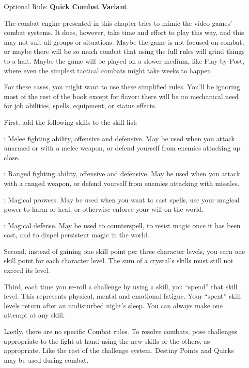 \begin{multiboco}
    Optional Rule: \textbf{Quick Combat Variant}\pc%

    The combat engine presented in this chapter tries to mimic the video games' combat systems. It does, however, take time and effort to play this way, and this may not suit all groups or situations. Maybe the game is not focused on combat, or maybe there will be so much combat that using the full rules will grind things to a halt. Maybe the game will be played on a slower medium, like Play-by-Post, where even the simplest tactical combats might take weeks to happen.

    For these cases, you might want to use these simplified rules. You'll be ignoring most of the rest of the book except for flavor: there will be no mechanical need for job abilities, spells, equipment, or status effects. 

    First, add the following skills to the skill list:

    : Melee fighting ability, offensive and defensive. May be used when you attack unarmed or with a melee weapon, or defend yourself from enemies attacking up close.

    : Ranged fighting ability, offensive and defensive. May be used when you attack with a ranged weapon, or defend yourself from enemies attacking with missiles.

    : Magical prowess. May be used when you want to cast spells, use your magical power to harm or heal, or otherwise enforce your will on the world.

    : Magical defense. May be used to counterspell, to resist magic once it has been cast, and to dispel persistent magic in the world. 

    Second, instead of gaining one skill point per three character levels, you earn one skill point for each character level. The sum of a crystal's skills must still not exceed its level.

    Third, each time you re-roll a challenge by using a skill, you ``spend'' that skill level. This represents physical, mental and emotional fatigue. Your ``spent'' skill levels return after an undisturbed night's sleep. You can always make one attempt at any skill.

    Lastly, there are no specific Combat rules. To resolve combats, pose challenges appropriate to the fight at hand using the new skills or the others, as appropriate. Like the rest of the challenge system, Destiny Points and Quirks may be used during combat.
\end{multiboco}

